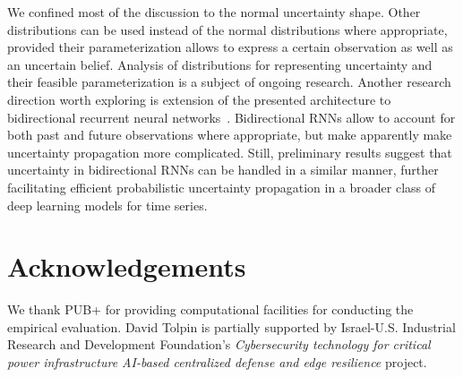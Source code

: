 \documentclass[runningheads]{llncs}
\begin{document}
We confined most of the discussion to the normal uncertainty shape.
Other distributions can be used instead of the normal
distributions where appropriate, provided their parameterization
allows to express a certain observation as well as an uncertain
belief. Analysis of distributions for representing uncertainty
and their feasible parameterization is a subject of ongoing
research. Another research direction worth exploring is
extension of the presented architecture to bidirectional
recurrent neural networks~\cite{BRH15}. Bidirectional RNNs allow
to account for both past and future observations where
appropriate, but make apparently make uncertainty propagation
more complicated. Still, preliminary results suggest that
uncertainty in bidirectional RNNs can be handled in a similar
manner, further facilitating efficient probabilistic uncertainty
propagation in a broader class of deep learning models for time
series.

\section*{Acknowledgements}

We thank PUB+ for providing computational facilities for
conducting the empirical evaluation. David Tolpin is partially
supported by Israel-U.S. Industrial Research and Development
Foundation's \textit{Cybersecurity technology for critical power
infrastructure AI-based centralized defense and edge resilience}
project.

\nocite{BDS21}
\nocite{CPK+18}
\nocite{SYG+19}
\nocite{KC18}
\nocite{LKW16}
\nocite{BRH15}
\nocite{AV20}
\nocite{FSK+16}
\nocite{MFS+21}
\nocite{FSP+16}
\nocite{SZN+19}
\nocite{LYY+19}
\nocite{CYP+21}
\nocite{YB21}
\nocite{CKD+15}
\nocite{HS97}
\nocite{CMB+14}
\nocite{WSY+21}



\end{document}
